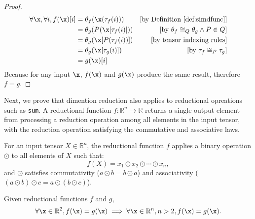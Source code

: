 \begin{proof}
\begin{align*}
\forall \x, \forall i, f(\x)[i]
   &= \theta_f(\x(\tau_f(i)))      &\text{[by Definition~\ref{def:simdfunc}]}\\
   &= \theta_g(P(\x[\tau_f(i)]))   &\text{[by $\theta_f\cong_Q \theta_g \land P\in Q$]}\\
   &= \theta_g(\x[P(\tau_f(i))])   &\text{[by tensor indexing rules]}\\
   &= \theta_g(\x[\tau_g(i)])      &\text{[by $\tau_f \cong_P \tau_g$]}\\
   &= g(\x)[i]
\end{align*}
Because for any input $\x$, $f(\x)$ and $g(\x)$ produce the same result,
therefore $f=g$.
\end{proof}

Next, we prove that dimention reduction also applies to
reductional opreations such as \texttt{sum}.
A reductional function $f: \mathbb{R}^n \rightarrow \mathbb{R}$ returns a single
output element from processing a reduction operation among all elements in the
input tensor, with the reduction operation satisfying the commutative and
associative laws.

\begin{definition}
For an input tensor $X \in \mathbb{R}^{n}$,
the reductional function $f$ applies a binary operation $\odot$ to all
elements of $X$ such that:
\[
f(X) = x_1 \odot x_2 \odot \cdots \odot x_n,
\]
and $\odot$ satisfies
    commutativity ($a \odot b = b \odot a$) and associativity ($(a \odot b) \odot c = a \odot (b \odot c)$).
\end{definition}


\begin{lemma}
Given reductional functions $f$ and $g$,
\[
\forall \x \in \mathbb{R}^2, f(\x) = g(\x) \implies \forall \x \in \mathbb{R}^{n}, n>2, f(\x) = g(\x).
\]
\label{th:reduce_equal}
\end{lemma}

